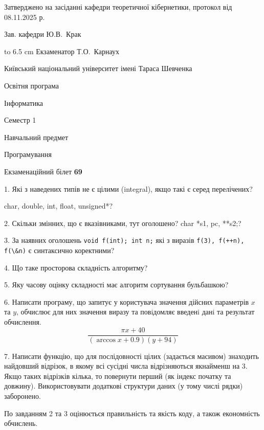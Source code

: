 \documentclass[12pt, ukrainian]{article}
\def\code#1{\Verb!#1!}
\begin{document}
{\smallskip\smallskip \begin {scriptsize} Затверджено на засіданні кафедри теоретичної кібернетики, протокол   від   08.11.2025 р.\par\smallskip\smallskip\smallskip\smallskip
{\parbox {6.5 cm} {Зав. кафедри \dotfill Ю.В.~Крак}}\hspace {0.7cm} {\hbox to 6.5 cm { Екзаменатор \dotfill Т.О.~Карнаух}} \end{scriptsize}}
\newpage
{{\begin {scriptsize}\par
{ \center  Київський національний університет імені Тараса Шевченка \par}
{\parbox {5 cm}{Освітня програма \hfill}{\parbox {7 cm}{Інформатика\hfill}}\parbox {6 cm}{\hfill Семестр 1}}\par
{\parbox {5 cm} {Навчальний предмет \hfill}\parbox {7 cm}{Програмування \hfill}\parbox {6cm}{\hfill}\par}\vspace{-15pt} \end{scriptsize}}{\center Екзаменаційний білет \No \textbf { 69 }\par}}
{%
1. Які з наведених типів не є цілими (integral), якщо такі є серед перелічених?

char, double, int, float, unsigned*?
\par
\vspace{2mm}
2. Скільки змінних, що є вказівниками, тут оголошено?
char *s1, pc, **s2;?
\par
\vspace{2mm}
3. За наявних оголошень \code{void f(int); int n;} які з виразів \code{f(3), f(++n), f(\&n)} є синтаксично коректними?
\par
\vspace{2mm}
4. Що таке просторова складність алгоритму?
\par
\vspace{2mm}
5. Яку часову оцінку складності має алгоритм сортування бульбашкою?
\par
\vspace{2mm}
6. Написати програму, що запитує у користувача значення дійсних параметрів $x$ та $y$, обчислює для них значення виразу та повiдомляє введенi данi та результат обчислення.
$$\frac{\pi x + 40}{(\arccos x + 0.9) (y + 94)}$$ 

\par
7. Написати функцію, що для послідовності цілих (задається масивом) знаходить найдовший відрізок, в якому всі сусідні числа відрізняються якнайменш на 3. Якщо таких відрізків кілька, то повернути перший (як індекс початку та довжину). Використовувати додаткові структури даних (у тому числі рядки) заборонено.

По завданням 2 та 3 оцінюється правильність та якість коду, а також економність обчислень.

}
\end{document}
